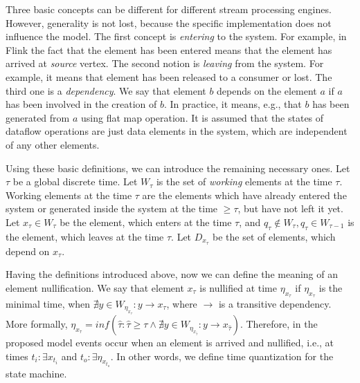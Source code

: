 \documentclass[sigconf]{acmart}
\theoremstyle{remark}
\begin{document}
Three basic concepts can be different for different stream processing engines. However, generality is not lost, because the specific implementation does not influence the model. The first concept is {\em entering} to the system. For example, in Flink the fact that the element has been entered means that the element has arrived at {\em source} vertex. The second notion is {\em leaving} from the system. For example, it means that element has been released to a consumer or lost. The third one is a {\em dependency}. We say that element $b$ depends on the element $a$ if $a$ has been involved in the creation of $b$. In practice, it means, e.g., that $b$ has been generated from $a$ using flat map operation. It is assumed that the states of dataflow operations are just data elements in the system, which are independent of any other elements.

Using these basic definitions, we can introduce the remaining necessary ones. Let $\tau$ be a global discrete time. Let $W_\tau$ is the set of {\em working} elements at the time $\tau$. Working elements at the time $\tau$ are the elements which have already entered the system or generated inside the system at the time $\geqslant{\tau}$, but have not left it yet. Let $x_\tau\in{W_\tau}$ be the element, which enters at the time $\tau$, and $q_\tau\notin{W_\tau},q_\tau\in{W_{\tau-1}}$ is the element, which leaves at the time $\tau$. Let $D_{x_{\tau}}$ be the set of elements, which depend on $x_\tau$.

Having the definitions introduced above, now we can define the meaning of an element nullification. We say that element $x_\tau$ is nullified at time $\eta_{x_{\tau}}$ if $\eta_{x_{\tau}}$ is the minimal time, when $\nexists{y\in{W_{\eta_{x_{\tau}}}}}:{y}\to{x_{\tau}}$, where $\to$ is a transitive dependency. More formally, $\eta_{x_{\tau}} = inf(\hat{\tau}:\hat{\tau}\geqslant{\tau}\land{\nexists{y\in{W_{\eta_{x_{\hat{\tau}}}}}}:{y}\to{x_{\hat{\tau}}}})$. Therefore, in the proposed model events occur when an element is arrived and nullified, i.e., at times $t_i:\exists{x_{t_i}}$ and $t_o:\exists{\eta_{x_{t_o}}}$. In other words, we define time quantization for the state machine.




\end{document}
